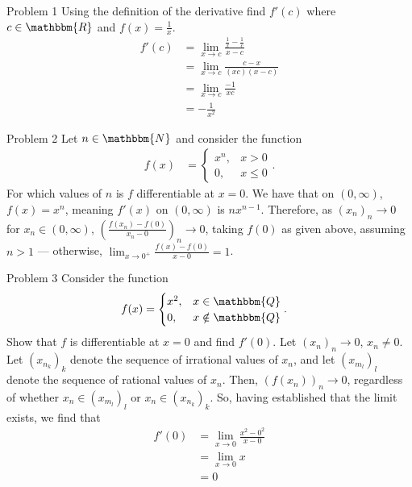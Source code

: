 \documentclass[8pt]{extarticle}
\title{}
\author{}
\date{}
\newcommand{\N}{\mathbbm{N}}
\newcommand{\Q}{\mathbbm{Q}}
\newcommand{\R}{\mathbbm{R}}
\begin{document}
  \begin{problem}{Problem 1}
    Using the definition of the derivative find $f'(c)$ where $c\in\R$ and $f(x) = \frac{1}{x}$.
    \tcblower
    \begin{align*}
      f'(c) &= \lim_{x\rightarrow c}\frac{\frac{1}{x}-\frac{1}{c}}{x-c}\\
            &= \lim_{x\rightarrow c}\frac{c-x}{(xc)(x-c)}\\
            &= \lim_{x\rightarrow c}\frac{-1}{xc}\\
            &= -\frac{1}{x^2}\tag*{$c\neq 0$}
    \end{align*}
  \end{problem}
  \begin{problem}{Problem 2}
    Let $n\in\N$ and consider the function
    \begin{align*}
      f(x) &= \begin{cases}
        x^n,&x > 0\\
        0,&x \leq 0
      \end{cases}.
    \end{align*}
    For which values of $n$ is $f$ differentiable at $x=0$.
    \tcblower
    We have that on $(0,\infty)$, $f(x) = x^n$, meaning $f'(x)$ on $(0,\infty)$ is $nx^{n-1}$. Therefore, as $(x_n)_n\rightarrow 0$ for $x_n\in (0,\infty)$, $\left(\frac{f(x_n) - f(0)}{x_n - 0}\right)_n \rightarrow 0$, taking $f(0)$ as given above, assuming $n > 1$ --- otherwise, $\lim_{x\rightarrow 0^{+}}\frac{f(x)-f(0)}{x-0} = 1$.
  \end{problem}
  \begin{problem}{Problem 3}
    Consider the function
    \begin{align*}
      f(x) &= \begin{cases}
        x^2,&x\in \Q\\
        0,&x\notin \Q
      \end{cases}.
    \end{align*}
    Show that $f$ is differentiable at $x=0$ and find $f'(0)$.
    \tcblower
    Let $(x_n)_n\rightarrow 0$, $x_n\neq 0$. Let $(x_{n_k})_k$ denote the sequence of irrational values of $x_n$, and let $(x_{m_l})_l$ denote the sequence of rational values of $x_n$. Then, $(f(x_n))_n \rightarrow 0$, regardless of whether $x_n \in (x_{m_l})_l$ or $x_n \in (x_{n_k})_k$. So, having established that the limit exists, we find that
    \begin{align*}
      f'(0) &= \lim_{x\rightarrow 0}\frac{x^2 - 0^2}{x-0}\\
            &= \lim_{x\rightarrow 0}x \\
            &= 0
    \end{align*}
  \end{problem}
\end{document}
